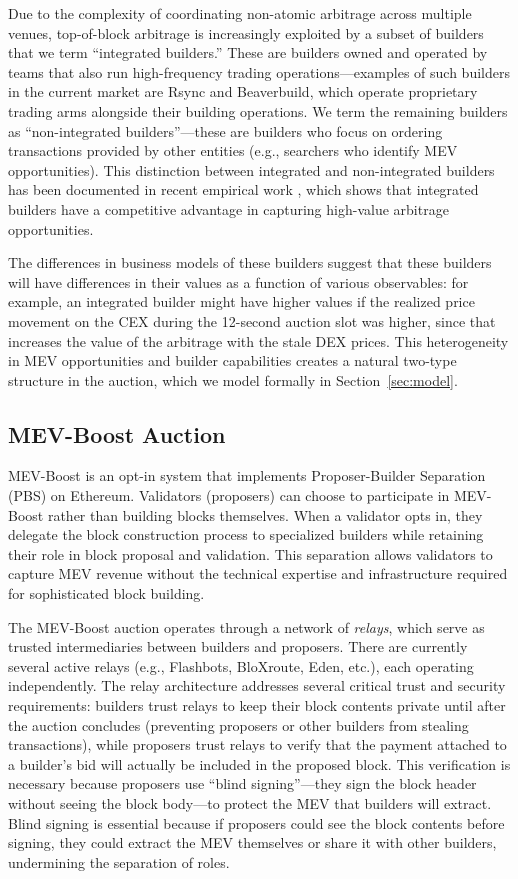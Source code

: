\documentclass[12pt,reqno]{amsart}
\begin{document}
Due to the complexity of coordinating non-atomic arbitrage across multiple venues, top-of-block arbitrage is increasingly exploited by a subset of builders that we term ``integrated builders.'' These are builders owned and operated by teams that also run high-frequency trading operations---examples of such builders in the current market are Rsync and Beaverbuild, which operate proprietary trading arms alongside their building operations. We term the remaining builders as ``non-integrated builders''---these are builders who focus on ordering transactions provided by other entities (e.g., searchers who identify MEV opportunities). This distinction between integrated and non-integrated builders has been documented in recent empirical work \citep{gupta2023centralizing, oz2024who}, which shows that integrated builders have a competitive advantage in capturing high-value arbitrage opportunities. 

The differences in business models of these builders suggest that these builders will have differences in their values as a function of various observables: for example, an integrated builder might have higher values if the realized price movement on the CEX during the 12-second auction slot was higher, since that increases the value of the arbitrage with the stale DEX prices. This heterogeneity in MEV opportunities and builder capabilities creates a natural two-type structure in the auction, which we model formally in Section~\ref{sec:model}.

\subsection{MEV-Boost Auction} \label{sec:mevboost}

MEV-Boost is an opt-in system that implements Proposer-Builder Separation (PBS) on Ethereum. Validators (proposers) can choose to participate in MEV-Boost rather than building blocks themselves. When a validator opts in, they delegate the block construction process to specialized builders while retaining their role in block proposal and validation. This separation allows validators to capture MEV revenue without the technical expertise and infrastructure required for sophisticated block building.

The MEV-Boost auction operates through a network of \textit{relays}, which serve as trusted intermediaries between builders and proposers. There are currently several active relays (e.g., Flashbots, BloXroute, Eden, etc.), each operating independently. The relay architecture addresses several critical trust and security requirements: builders trust relays to keep their block contents private until after the auction concludes (preventing proposers or other builders from stealing transactions), while proposers trust relays to verify that the payment attached to a builder's bid will actually be included in the proposed block. This verification is necessary because proposers use ``blind signing''---they sign the block header without seeing the block body---to protect the MEV that builders will extract. Blind signing is essential because if proposers could see the block contents before signing, they could extract the MEV themselves or share it with other builders, undermining the separation of roles.
\end{document}
